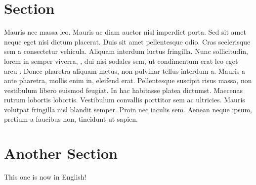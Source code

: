\section {Section}
Mauris nec massa leo. Mauris ac diam auctor nisl imperdiet porta. Sed sit amet neque eget nisi dictum placerat. Duis sit amet pellentesque odio. Cras scelerisque sem a consectetur vehicula. Aliquam interdum luctus fringilla. Nunc sollicitudin, lorem in semper viverra, \citet{Goldreich_1990}, dui nisi sodales sem, ut condimentum erat leo eget arcu \citep{Goldreich_1990,Kumar_1994}. Donec pharetra aliquam metus, non pulvinar tellus interdum a. Mauris a ante pharetra, mollis enim in, eleifend erat. Pellentesque suscipit risus massa, non vestibulum libero euismod feugiat. In hac habitasse platea dictumst. Maecenas rutrum lobortis lobortis. Vestibulum convallis porttitor sem ac ultricies. Mauris volutpat fringilla nisl blandit semper. Proin nec iaculis sem. Aenean neque ipsum, pretium a faucibus non, tincidunt ut sapien.

\section{Another Section}
This one is now in English!
